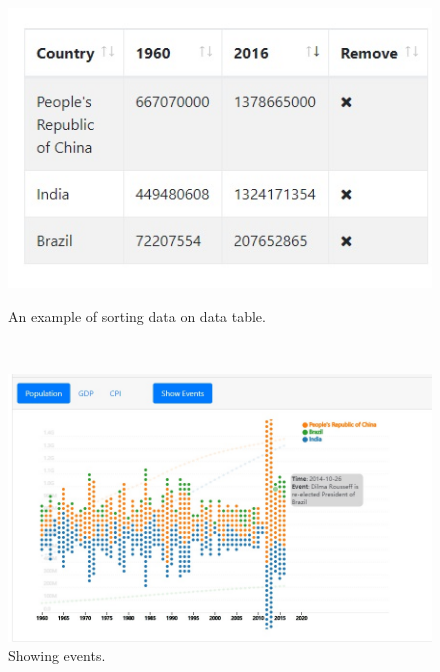 \documentclass[12pt, fullpage,letterpaper]{article}
\begin{document}
\begin{figure}[h!]
    \begin{minipage}{0.49\linewidth}
        \centering
        \includegraphics[width=\textwidth]{figs/datatable.jpg}
        \caption{An example of sorting data on data table.}
        \label{fig:datatable}
    \end{minipage}
    \hfill\
    \begin{minipage}{0.49\linewidth}
        \centering
        \includegraphics[width=\textwidth]{figs/events.jpg}
        \caption{Showing events.}
        \label{fig:events}
    \end{minipage}
\end{figure} 
\end{document}
